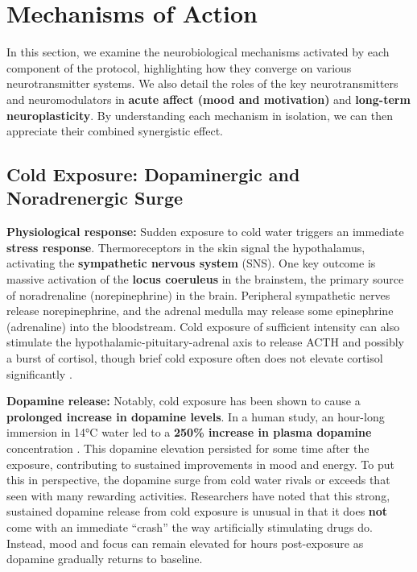\documentclass[11pt]{article}
\newcommand{\quotes}[1]{``#1''}
\begin{document}
\section{Mechanisms of Action}
In this section, we examine the neurobiological mechanisms activated by each component of the protocol, highlighting how they converge on various neurotransmitter systems. We also detail the roles of the key neurotransmitters and neuromodulators in \textbf{acute affect (mood and motivation)} and \textbf{long-term neuroplasticity}. By understanding each mechanism in isolation, we can then appreciate their combined synergistic effect.

\subsection{Cold Exposure: Dopaminergic and Noradrenergic Surge}
\textbf{Physiological response:} Sudden exposure to cold water triggers an immediate \textbf{stress response}. Thermoreceptors in the skin signal the hypothalamus, activating the \textbf{sympathetic nervous system} (SNS). One key outcome is massive activation of the \textbf{locus coeruleus} in the brainstem, the primary source of noradrenaline (norepinephrine) in the brain. Peripheral sympathetic nerves release norepinephrine, and the adrenal medulla may release some epinephrine (adrenaline) into the bloodstream. Cold exposure of sufficient intensity can also stimulate the hypothalamic-pituitary-adrenal axis to release ACTH and possibly a burst of cortisol, though brief cold exposure often does not elevate cortisol significantly \cite{Brenner2001}.

\textbf{Dopamine release:} Notably, cold exposure has been shown to cause a \textbf{prolonged increase in dopamine levels}. In a human study, an hour-long immersion in 14°C water led to a \textbf{250\% increase in plasma dopamine} concentration \cite{Brenner2001}. This dopamine elevation persisted for some time after the exposure, contributing to sustained improvements in mood and energy. To put this in perspective, the dopamine surge from cold water rivals or exceeds that seen with many rewarding activities. Researchers have noted that this strong, sustained dopamine release from cold exposure is unusual in that it does \textbf{not} come with an immediate \quotes{crash} the way artificially stimulating drugs do. Instead, mood and focus can remain elevated for hours post-exposure as dopamine gradually returns to baseline.
\end{document}
